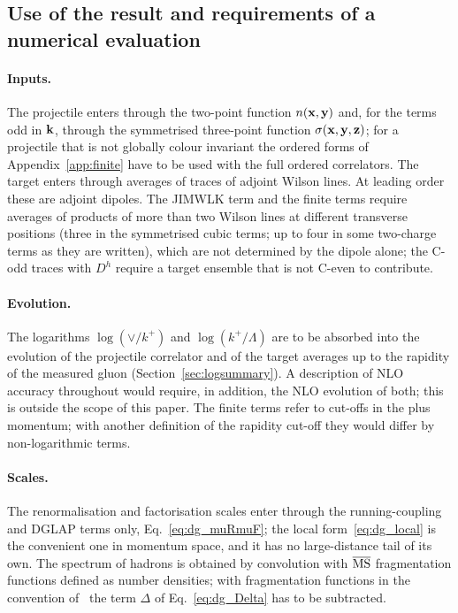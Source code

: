 \subsection{Use of the result and requirements of a numerical evaluation}\label{sec:disc_use}

\paragraph{Inputs.} The projectile enters through the two-point function $n(\mathbf{x},\mathbf{y})$ and, for the terms odd in $\mathbf{k}$, through the symmetrised three-point function $\sigma(\mathbf{x},\mathbf{y},\mathbf{z})$; for a projectile that is not globally colour invariant the ordered forms of Appendix~\ref{app:finite} have to be used with the full ordered correlators. The target enters through averages of traces of adjoint Wilson lines. At leading order these are adjoint dipoles. The JIMWLK term and the finite terms require averages of products of more than two Wilson lines at different transverse positions (three in the symmetrised cubic terms; up to four in some two-charge terms as they are written), which are not determined by the dipole alone; the C-odd traces with $D^h$ require a target ensemble that is not C-even to contribute.

\paragraph{Evolution.} The logarithms $\log(\vee/k^+)$ and $\log(k^+/\Lambda)$ are to be absorbed into the evolution of the projectile correlator and of the target averages up to the rapidity of the measured gluon (Section~\ref{sec:logsummary}). A description of NLO accuracy throughout would require, in addition, the NLO evolution of both; this is outside the scope of this paper. The finite terms refer to cut-offs in the plus momentum; with another definition of the rapidity cut-off they would differ by non-logarithmic terms.

\paragraph{Scales.} The renormalisation and factorisation scales enter through the running-coupling and DGLAP terms only, Eq.~\eqref{eq:dg_muRmuF}; the local form~\eqref{eq:dg_local} is the convenient one in momentum space, and it has no large-distance tail of its own. The spectrum of hadrons is obtained by convolution with $\overline{\rm MS}$ fragmentation functions defined as number densities; with fragmentation functions in the convention of~\cite{Chirilli:2012jd} the term $\Delta$ of Eq.~\eqref{eq:dg_Delta} has to be subtracted.

